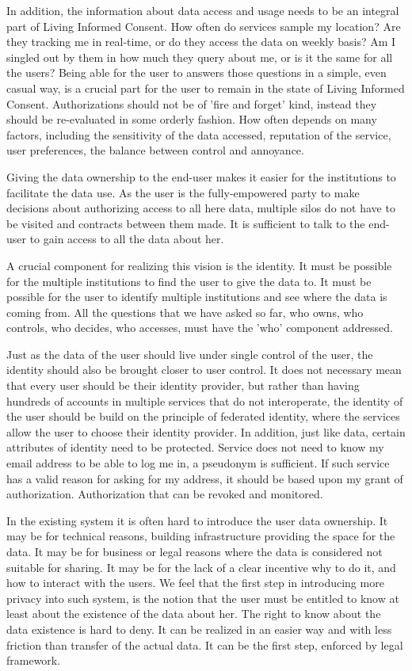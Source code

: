 In addition, the information about data access and usage needs to be an integral part of Living Informed Consent.
How often do services sample my location?
Are they tracking me in real-time, or do they access the data on weekly basis? 
Am I singled out by them in how much they query about me, or is it the same for all the users?
Being able for the user to answers those questions in a simple, even casual way, is a crucial part for the user to remain in the state of Living Informed Consent.
Authorizations should not be of 'fire and forget' kind, instead they should be re-evaluated in some orderly fashion.
How often depends on many factors, including the sensitivity of the data accessed, reputation of the service, user preferences, the balance between control and annoyance. 

Giving the data ownership to the end-user makes it easier for the institutions to facilitate the data use.
As the user is the fully-empowered party to make decisions about authorizing access to all here data, multiple silos do not have to be visited and contracts between them made.
It is sufficient to talk to the end-user to gain access to all the data about her. 

A crucial component for realizing this vision is the identity.
It must be possible for the multiple institutions to find the user to give the data to. It must be possible for the user to identify multiple institutions and see where the data is coming from. 
All the questions that we have asked so far, who owns, who controls, who decides, who accesses, must have the 'who' component addressed.

Just as the data of the user should live under single control of the user, the identity should also be brought closer to user control.
It does not necessary mean that every user should be their identity provider, but rather than having hundreds of accounts in multiple services that do not interoperate, the identity of the user should be build on the principle of federated identity, where the services allow the user to choose their identity provider.
In addition, just like data, certain attributes of identity need to be protected.
Service does not need to know my email address to be able to log me in, a pseudonym is sufficient.
If such service has a valid reason for asking for my address, it should be based upon my grant of authorization.
Authorization that can be revoked and monitored.

In the existing system it is often hard to introduce the user data ownership. It may be for technical reasons, building infrastructure providing the space for the data.
It may be for business or legal reasons where the data is considered not suitable for sharing.
It may be for the lack of a clear incentive why to do it, and how to interact with the users.
We feel that the first step in introducing more privacy into such system, is the notion that the user must be entitled to know at least about the existence of the data about her.
The right to know about the data existence is hard to deny. It can be realized in an easier way and with less friction than transfer of the actual data. It can be the first step, enforced by legal framework.